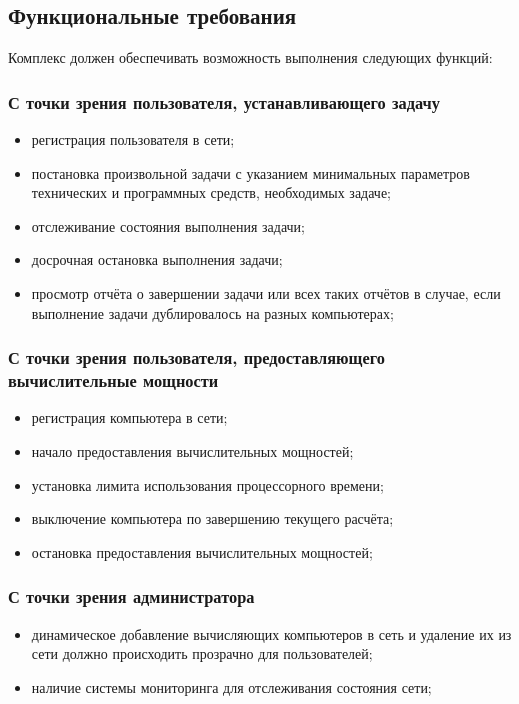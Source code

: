 \documentclass[a4paper,12pt]{report}
\numberwithin{equation}{section}
\begin{document}
\subsection{Функциональные требования}
Комплекс должен обеспечивать возможность выполнения следующих функций:
\subsubsection{С точки зрения пользователя, устанавливающего задачу}
\begin{itemize}
  \item регистрация пользователя в сети;
  \item постановка произвольной задачи с указанием минимальных параметров технических и программных средств, необходимых задаче;
  \item отслеживание состояния выполнения задачи;
  \item досрочная остановка выполнения задачи;
  \item просмотр отчёта о завершении задачи или всех таких отчётов в случае, если выполнение задачи дублировалось на разных компьютерах;
\end{itemize}

\subsubsection{С точки зрения пользователя, предоставляющего вычислительные мощности}
\begin{itemize}
  \item регистрация компьютера в сети;
  \item начало предоставления вычислительных мощностей;
  \item установка лимита использования процессорного времени;
  \item выключение компьютера по завершению текущего расчёта;
  \item остановка предоставления вычислительных мощностей;
\end{itemize}

\subsubsection{С точки зрения администратора}
\begin{itemize}
  \item динамическое добавление вычисляющих компьютеров в сеть и удаление их из сети должно происходить прозрачно для пользователей;
  \item наличие системы мониторинга для отслеживания состояния сети;
\end{itemize}
\end{document}
